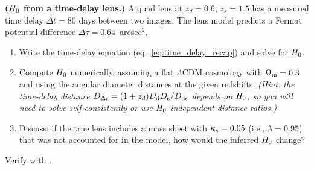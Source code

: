 \begin{exercise}
\label{ex:H0_time_delay}
\textbf{($H_0$ from a time-delay lens.)}
A quad lens at $z_d = 0.6$, $z_s = 1.5$ has a measured time delay
$\Delta t = 80$ days between two images.  The lens model predicts
a Fermat potential difference $\Delta\tau = 0.64$~arcsec$^2$.
\begin{enumerate}[label=(\alph*)]
    \item Write the time-delay equation
          (eq.~\ref{eq:time_delay_recap}) and solve for $H_0$.
    \item Compute $H_0$ numerically, assuming a flat $\Lambda$CDM
          cosmology with $\Omega_{\mathrm{m}} = 0.3$ and using the angular
          diameter distances at the given redshifts.  \textit{(Hint:
          the time-delay distance $D_{\Delta t} = (1+z_d)D_{\mathrm{d}}D_{\mathrm{s}}/D_{\mathrm{ds}}$
          depends on $H_0$, so you will need to solve
          self-consistently or use $H_0$-independent distance
          ratios.)}
    \item Discuss: if the true lens includes a mass sheet with
          $\kappa_s = 0.05$ (i.e., $\lambda = 0.95$) that was not
          accounted for in the model, how would the inferred $H_0$
          change?
\end{enumerate}
Verify with
.
\end{exercise}

